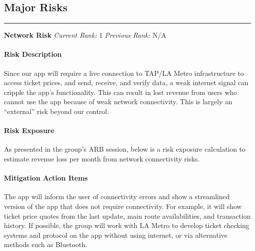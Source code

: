\newcommand{\risk}[6]{
	\rule{\textwidth}{.1pt}
	\textbf{#1} \textit{Current Rank:} #2 \textit{Previous Rank:} #3 \\
	\paragraph{Risk Description} #4
	\paragraph{Risk Exposure} #5
	\paragraph{Mitigation Action Items} #6\\
}

\newcommand{\nrisk}[5]{
	\rule{\textwidth}{.1pt}
	\textbf{#1} \textit{Current Rank:} #2 \textit{Previous Rank:} #3 \\
	\paragraph{Risk Description} #4
	\paragraph{Mitigation Action Items} #5\\
}

\subsection{Major Risks}

\risk{Network Risk}{1}{N/A}{
Since our app will require a live connection to TAP/LA Metro infrastructure to access ticket prices, and send, receive, and verify data, a weak internet signal can cripple the app's functionality. This can result in lost revenue from users who cannot use the app because of weak network connectivity. This is largely an “external” risk beyond our control.
}{
As presented in the group’s ARB session, below is a risk exposure calculation to estimate revenue loss per month from network connectivity risks.

}{
The app will inform the user of connectivity errors and show a streamlined version of the app that does not require connectivity. For example, it will show ticket price quotes from the last update, main route availabilities, and transaction history. If possible, the group will work with LA Metro to develop ticket checking systems and protocol on the app without using internet, or via alternative methods such as Bluetooth.
}

